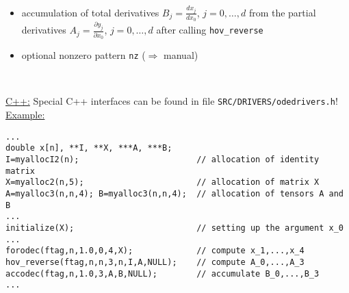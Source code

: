 \documentclass[12pt,oneside,a4paper]{article}
\begin{document}
\begin{center}
\begin{minipage}[h]{15cm}
\begin{itemize}
\item accumulation of total derivatives $B_j=\frac{d x_j}{d x_0}$,
 $j=0,\ldots,d$ from the partial derivatives 
 $A_j=\frac{\partial y_j}{\partial x_0}$, $j=0,\ldots,d$
 after calling {\tt hov\_reverse} 
\item  optional nonzero pattern {\tt nz} ($\Rightarrow$ manual)
\end{itemize}
\end{minipage}\\[4ex]
%
\begin{minipage}[h]{160mm}
\small
\underline{C++:} \hspace{0.5cm} Special C++ interfaces can be found in 
                 file {\tt SRC/DRIVERS/odedrivers.h}!\\[3ex]
\underline{Example:}
\begin{verbatim}
...
double x[n], **I, **X, ***A, ***B;
I=myallocI2(n);                        // allocation of identity matrix
X=myalloc2(n,5);                       // allocation of matrix X
A=myalloc3(n,n,4); B=myalloc3(n,n,4);  // allocation of tensors A and B
...
initialize(X);                         // setting up the argument x_0
...
forodec(ftag,n,1.0,0,4,X);             // compute x_1,...,x_4
hov_reverse(ftag,n,n,3,n,I,A,NULL);    // compute A_0,...,A_3
accodec(ftag,n,1.0,3,A,B,NULL);        // accumulate B_0,...,B_3
...
\end{verbatim}
\end{minipage}
%
\end{center}
\end{document}
